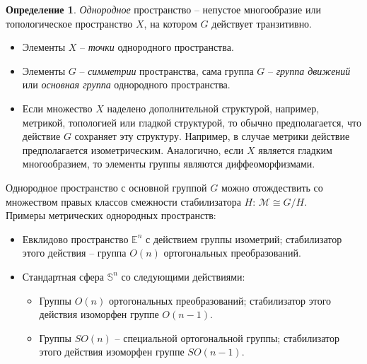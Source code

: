 \documentclass[12pt]{article}
\theoremstyle{definition}
\newtheorem{defin}[theorem]{Определение}
\begin{document}
\begin{defin}
\textit{Однородное} пространство -- непустое многообразие или топологическое пространство $X$, на котором $G$ действует транзитивно.
\begin{itemize}
    \item Элементы $X$ -- \textit{точки} однородного пространства.
    \item Элементы $G$ -- \textit{симметрии} пространства, сама группа $G$ -- \textit{группа движений} или \textit{основная группа} однородного пространства.
    \item Если множество $X$ наделено дополнительной структурой, например, метрикой, топологией или гладкой структурой, то обычно предполагается, что действие $G$ сохраняет эту структуру. Например, в случае метрики действие предполагается изометрическим. Аналогично, если $X$ является гладким многообразием, то элементы группы являются диффеоморфизмами.
\end{itemize}
\end{defin}
Однородное пространство с основной группой $G$ можно отождествить со множеством правых классов смежности стабилизатора $H$: $\mathcal{M}\cong G/H$.\\
Примеры метрических однородных пространств:
\begin{itemize}
    \item Евклидово пространство $\mathbb{E}^n$ с действием группы изометрий; стабилизатор этого действия -- группа $O(n)$ ортогональных преобразований.
    \item Стандартная сфера $\mathbb{S}^n$ со следующими действиями:
    \begin{itemize}
        \item Группы $O(n)$ ортогональных преобразований; стабилизатор этого действия изоморфен группе $O(n-1)$.
        \item Группы $SO(n)$ -- специальной ортогональной группы; стабилизатор этого действия изоморфен группе $SO(n-1)$.
    \end{itemize}
\end{itemize}
\end{document}
